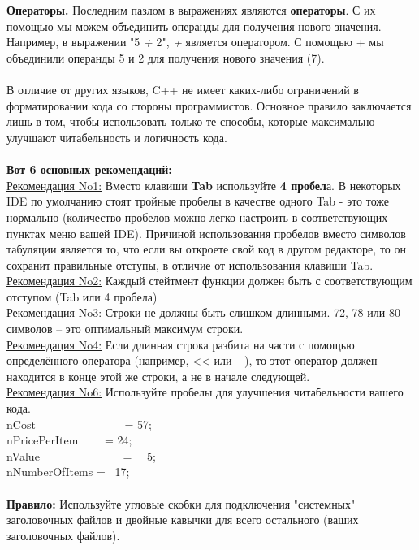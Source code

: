\documentclass[a4paper,16pt]{report} %
\begin{document}
\\ \\
\textbf{Операторы.}
Последним пазлом в выражениях являются \textbf{операторы}. С их помощью мы можем объединить операнды для получения нового значения. Например, в выражении "5 \textit{+} 2", \textit{+} является оператором. С помощью + мы объединили операнды 5 и 2 для получения нового значения (7).
\\ \\
В отличие от других языков, C++ не имеет каких-либо ограничений в форматировании кода со стороны программистов. Основное правило заключается лишь в том, чтобы использовать только те способы, которые максимально улучшают читабельность и логичность кода.
\\ \\
\textbf{Вот 6 основных рекомендаций:}
\\ 
\underline{Рекомендация No1:} Вместо клавиши \textbf{Tab} используйте \textbf{4 пробел}а. В некоторых IDE по умолчанию стоят тройные пробелы в качестве одного Tab - это тоже нормально (количество пробелов можно легко настроить в соответствующих пунктах меню вашей IDE).
Причиной использования пробелов вместо символов табуляции является то, что если вы откроете свой код в другом редакторе, то он сохранит правильные отступы, в отличие от использования клавиши Tab.
\\
\underline{Рекомендация No2:} Каждый стейтмент функции должен быть с
соответствующим отступом (Tab или 4 пробела)
\\
\underline{Рекомендация No3:} Строки не должны быть слишком длинными. 72, 78 или 80 символов – это оптимальный максимум строки.
\\
\underline{Рекомендация No4:} Если длинная строка разбита на части с помощью определённого оператора (например, << или +), то этот оператор должен находится в конце этой же строки, а не в начале следующей.
\\
\underline{Рекомендация No6:} Используйте пробелы для улучшения читабельности вашего кода.
\\
nCost \ \ \ \ \ \ \ \ \ \ \ \ \ \ \ = 57;\\
nPricePerItem \ \ \ \  = 24;\\
nValue \ \ \ \ \ \ \ \ \ \ \ \ \ \ = \ \ 5;\\
nNumberOfItems = \ 17;\\
\\
\textbf{Правило:} Используйте угловые скобки для подключения
"системных" заголовочных файлов и двойные кавычки для всего остального (ваших заголовочных файлов).
\end{document}
